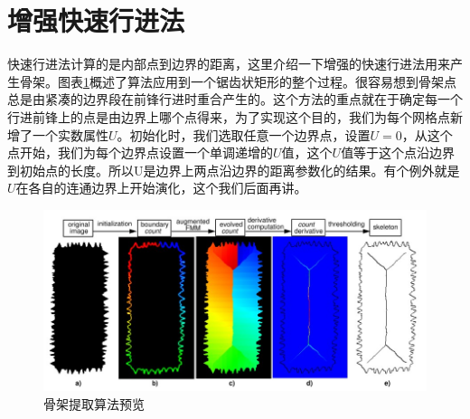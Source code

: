\section{增强快速行进法}
快速行进法计算的是内部点到边界的距离，这里介绍一下增强的快速行进法用来产生骨架。图表\ref{skel_overview}概述了算法应用到一个锯齿状矩形的整个过程。很容易想到骨架点总是由紧凑的边界段在前锋行进时重合产生的。这个方法的重点就在于确定每一个行进前锋上的点是由边界上哪个点得来，为了实现这个目的，我们为每个网格点新增了一个实数属性$U$。初始化时，我们选取任意一个边界点，设置$U=0$，从这个点开始，我们为每个边界点设置一个单调递增的$U$值，这个$U$值等于这个点沿边界到初始点的长度。所以U是边界上两点沿边界的距离参数化的结果。有个例外就是$U$在各自的连通边界上开始演化，这个我们后面再讲。
\begin{figure}[h!]
    \centering
    \includegraphics[height=200bp]{figure/skel_overview.png}
    \caption{骨架提取算法预览}
    \label{skel_overview}
\end{figure}

